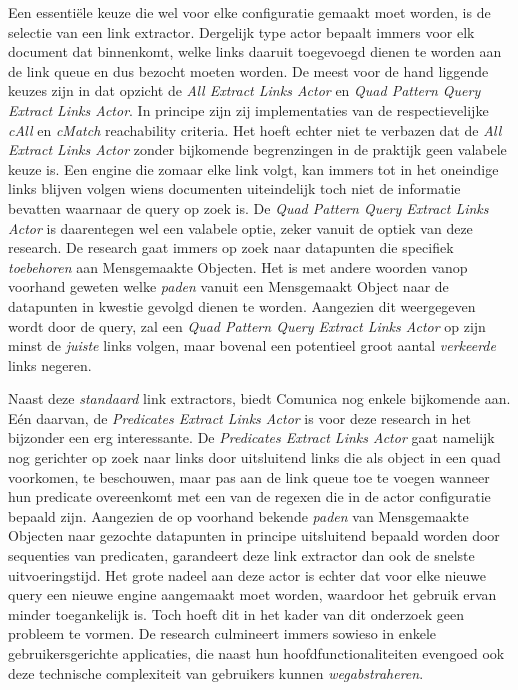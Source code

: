 \documentclass[conference]{IEEEtran}
\begin{document}
Een essentiële keuze die wel voor elke configuratie gemaakt moet worden, is de selectie van een link extractor. Dergelijk type actor bepaalt immers voor elk document dat binnenkomt, welke links daaruit toegevoegd dienen te worden aan de link queue en dus bezocht moeten worden. De meest voor de hand liggende keuzes zijn in dat opzicht de \textit{All Extract Links Actor} en \textit{Quad Pattern Query Extract Links Actor}. In principe zijn zij implementaties van de respectievelijke \textit{cAll} en \textit{cMatch} reachability criteria. Het hoeft echter niet te verbazen dat de \textit{All Extract Links Actor} zonder bijkomende begrenzingen in de praktijk geen valabele keuze is. Een engine die zomaar elke link volgt, kan immers tot in het oneindige links blijven volgen wiens documenten uiteindelijk toch niet de informatie bevatten waarnaar de query op zoek is. De \textit{Quad Pattern Query Extract Links Actor} is daarentegen wel een valabele optie, zeker vanuit de optiek van deze research. De research gaat immers op zoek naar datapunten die specifiek \textit{toebehoren} aan Mensgemaakte Objecten. Het is met andere woorden vanop voorhand geweten welke \textit{paden} vanuit een Mensgemaakt Object naar de datapunten in kwestie gevolgd dienen te worden. Aangezien dit weergegeven wordt door de query, zal een \textit{Quad Pattern Query Extract Links Actor} op zijn minst de \textit{juiste} links volgen, maar bovenal een potentieel groot aantal \textit{verkeerde} links negeren.

Naast deze \textit{standaard} link extractors, biedt Comunica nog enkele bijkomende aan. Eén daarvan, de \textit{Predicates Extract Links Actor} is voor deze research in het bijzonder een erg interessante. De \textit{Predicates Extract Links Actor} gaat namelijk nog gerichter op zoek naar links door uitsluitend links die als object in een quad voorkomen, te beschouwen, maar pas aan de link queue toe te voegen wanneer hun predicate overeenkomt met een van de regexen die in de actor configuratie bepaald zijn. Aangezien de op voorhand bekende \textit{paden} van Mensgemaakte Objecten naar gezochte datapunten in principe uitsluitend bepaald worden door sequenties van predicaten, garandeert deze link extractor dan ook de snelste uitvoeringstijd. Het grote nadeel aan deze actor is echter dat voor elke nieuwe query een nieuwe engine aangemaakt moet worden, waardoor het gebruik ervan minder toegankelijk is. Toch hoeft dit in het kader van dit onderzoek geen probleem te vormen. De research culmineert immers sowieso in enkele gebruikersgerichte applicaties, die naast hun hoofdfunctionaliteiten evengoed ook deze technische complexiteit van gebruikers kunnen \textit{wegabstraheren}.
\end{document}
